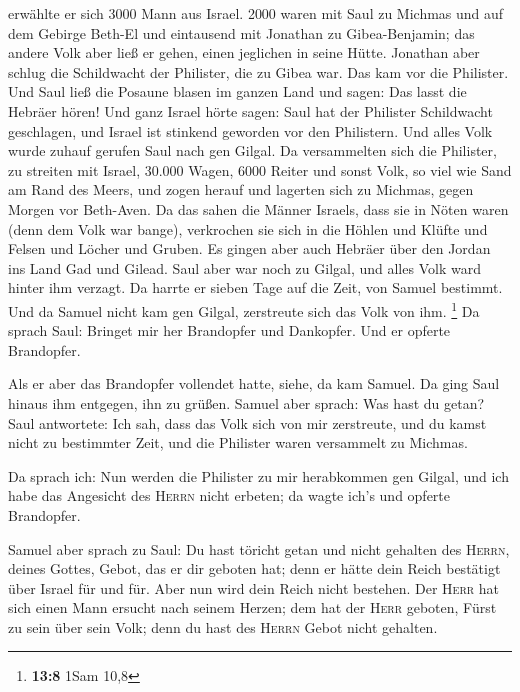  erwählte er sich 3000 Mann aus Israel. 2000 waren mit
Saul zu Michmas und auf dem Gebirge Beth-El und eintausend mit Jonathan
zu Gibea-Benjamin; das andere Volk aber ließ er gehen, einen jeglichen
in seine Hütte.  Jonathan aber schlug die Schildwacht der
Philister, die zu Gibea war. Das kam vor die Philister. Und Saul ließ
die Posaune blasen im ganzen Land und sagen: Das lasst die Hebräer
hören!  Und ganz Israel hörte sagen: Saul hat der
Philister Schildwacht geschlagen, und Israel ist stinkend geworden vor
den Philistern. Und alles Volk wurde zuhauf gerufen Saul nach gen
Gilgal.  Da versammelten sich die Philister, zu streiten
mit Israel, 30.000 Wagen, 6000 Reiter und sonst Volk, so viel wie Sand
am Rand des Meers, und zogen herauf und lagerten sich zu Michmas, gegen
Morgen vor Beth-Aven.  Da das sahen die Männer Israels,
dass sie in Nöten waren (denn dem Volk war bange), verkrochen sie sich
in die Höhlen und Klüfte und Felsen und Löcher und Gruben.
 Es gingen aber auch Hebräer über den Jordan ins Land Gad
und Gilead. Saul aber war noch zu Gilgal, und alles Volk ward hinter ihm
verzagt.  Da harrte er sieben Tage auf die Zeit, von
Samuel bestimmt. Und da Samuel nicht kam gen Gilgal, zerstreute sich das
Volk von ihm. \footnote{\textbf{13:8} 1Sam 10,8}  Da
sprach Saul: Bringet mir her Brandopfer und Dankopfer. Und er opferte
Brandopfer.

 Als er aber das Brandopfer vollendet hatte, siehe, da
kam Samuel. Da ging Saul hinaus ihm entgegen, ihn zu grüßen.
 Samuel aber sprach: Was hast du getan? Saul antwortete:
Ich sah, dass das Volk sich von mir zerstreute, und du kamst nicht zu
bestimmter Zeit, und die Philister waren versammelt zu Michmas.

 Da sprach ich: Nun werden die Philister zu mir
herabkommen gen Gilgal, und ich habe das Angesicht des \textsc{Herrn}
nicht erbeten; da wagte ich's und opferte Brandopfer.

 Samuel aber sprach zu Saul: Du hast töricht getan und
nicht gehalten des \textsc{Herrn}, deines Gottes, Gebot, das er dir
geboten hat; denn er hätte dein Reich bestätigt über Israel für und für.
 Aber nun wird dein Reich nicht bestehen. Der
\textsc{Herr} hat sich einen Mann ersucht nach seinem Herzen; dem hat
der \textsc{Herr} geboten, Fürst zu sein über sein Volk; denn du hast
des \textsc{Herrn} Gebot nicht gehalten.

